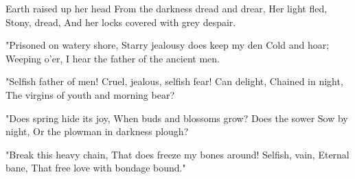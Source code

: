 
\begin{poem}

\begin{stanza}
Earth raised up her head\verseline
From the darkness dread and drear,\verseline
Her light fled,\verseline
Stony, dread,\verseline
And her locks covered with grey despair.
\end{stanza}
\begin{stanza}
"Prisoned on watery shore,\verseline
Starry jealousy does keep my den\verseline
Cold and hoar;\verseline
Weeping o'er,\verseline
I hear the father of the ancient men.
\end{stanza}
\begin{stanza}
"Selfish father of men!\verseline
Cruel, jealous, selfish fear!\verseline
Can delight,\verseline
Chained in night,\verseline
The virgins of youth and morning bear?
\end{stanza}
\begin{stanza}
"Does spring hide its joy,\verseline
When buds and blossoms grow?\verseline
Does the sower\verseline
Sow by night,\verseline
Or the plowman in darkness plough?
\end{stanza}
\begin{stanza}
"Break this heavy chain,\verseline
That does freeze my bones around!\verseline
Selfish, vain,\verseline
Eternal bane,\verseline
That free love with bondage bound."
\end{stanza}

\end{poem}